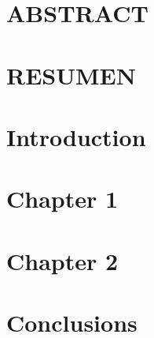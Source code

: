 \documentclass[pdftex]{pucthesis}	          %
\begin{document}
\cleardoublepage



\tableofcontents
{} \label{listoffigures}
\listoffigures
{} \label{listoftables}
\listoftables
\cleardoublepage



 \label{abstract}
\chapter*{ABSTRACT}

\cleardoublepage

 \label{resumen}
\chapter*{RESUMEN}

\cleardoublepage



\chapter[INTRODUCTION]{Introduction}


\chapter[CHAPTER 1]{Chapter 1} \label{ch1}


\chapter[CHAPTER 2]{Chapter 2} \label{ch2}


\chapter[CONCLUSIONS]{Conclusions}

\end{document}
